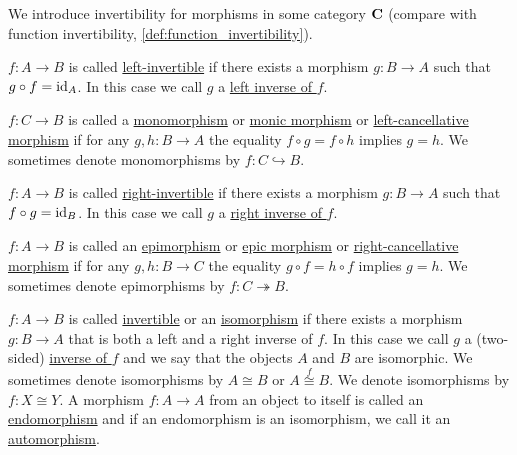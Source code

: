 \begin{definition}\label{def:morphism_invertibility}
  We introduce invertibility for morphisms in some category $\operatorname{\mathbf{C}}$ (compare with function invertibility, \cref{def:function_invertibility}).

  \begin{defenum}
    \item\label{def:morphism_invertibility/left_invertible} $f: A \to B$ is called \ul{left-invertible} if there exists a morphism $g: B \to A$ such that $g \circ f = \operatorname{id}_A$. In this case we call $g$ a \ul{left inverse of $f$}.

    \item\label{def:morphism_invertibility/monomorphism} $f: C \to B$ is called a \ul{monomorphism} or \ul{monic morphism} or \ul{left-cancellative morphism} if for any $g, h: B \to A$ the equality $f \circ g = f \circ h$ implies $g = h$. We sometimes denote monomorphisms by $f: C \hookrightarrow B$.

    \item\label{def:morphism_invertibility/right_invertible} $f: A \to B$ is called \ul{right-invertible} if there exists a morphism $g: B \to A$ such that $f \circ g = \operatorname{id}_B$. In this case we call $g$ a \ul{right inverse of $f$}.

    \item\label{def:morphism_invertibility/epimorphism} $f: A \to B$ is called an \ul{epimorphism} or \ul{epic morphism} or \ul{right-cancellative morphism} if for any $g, h: B \to C$ the equality $g \circ f = h \circ f$ implies $g = h$. We sometimes denote epimorphisms by $f: C \twoheadrightarrow B$.

    \item\label{def:morphism_invertibility/isomorphism} $f: A \to B$ is called \ul{invertible} or an \ul{isomorphism} if there exists a morphism $g: B \to A$ that is both a left and a right inverse of $f$. In this case we call $g$ a (two-sided) \ul{inverse of $f$} and we say that the objects $A$ and $B$ are isomorphic. We sometimes denote isomorphisms by $A \cong B$ or $A \overset f \cong B$. We denote isomorphisms by $f: X \cong Y$. A morphism $f: A \to A$ from an object to itself is called an \ul{endomorphism} and if an endomorphism is an isomorphism, we call it an \ul{automorphism}.
  \end{defenum}
\end{definition}

